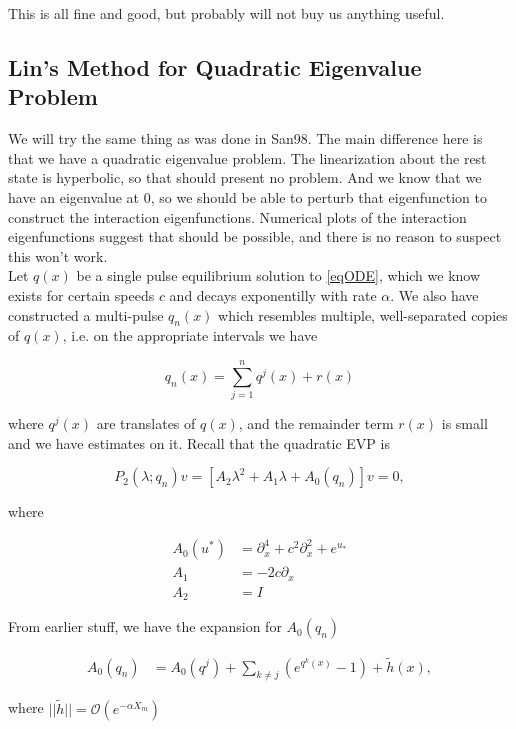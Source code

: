 \documentclass[12pt]{article}
\begin{document}
This is all fine and good, but probably will not buy us anything useful.


\subsection{Lin's Method for Quadratic Eigenvalue Problem}

We will try the same thing as was done in San98. The main difference here is that we have a quadratic eigenvalue problem. The linearization about the rest state is hyperbolic, so that should present no problem. And we know that we have an eigenvalue at 0, so we should be able to perturb that eigenfunction to construct the interaction eigenfunctions. Numerical plots of the interaction eigenfunctions suggest that should be possible, and there is no reason to suspect this won't work.\\


Let $q(x)$ be a single pulse equilibrium solution to \eqref{eqODE}, which we know exists for certain speeds $c$ and decays exponentilly with rate $\alpha$. We also have constructed a multi-pulse $q_n(x)$ which resembles multiple, well-separated copies of $q(x)$, i.e. on the appropriate intervals we have 

\[
q_n(x) = \sum_{j = 1}^{n} q^j(x) + r(x)
\]

where $q^j(x)$ are translates of $q(x)$, and the remainder term $r(x)$ is small and we have estimates on it. Recall that the quadratic EVP is

\begin{equation}\label{quadeig}
P_2(\lambda; q_n)v =  [A_2 \lambda^2 + A_1 \lambda + A_0(q_n)]v = 0,
\end{equation} 

where

\begin{align}
A_0(u^*) &= \partial_x^4 + c^2 \partial_x^2 + e^{u_*} \\
A_1 &= -2 c \partial_x \\
A_2 &= I
\end{align}

From earlier stuff, we have the expansion for $A_0(q_n)$

\begin{align}\label{A0expansion} 
A_0(q_n) &= A_0(q^j) + \sum_{k \neq j} (e^{q^k(x)} - 1) + \tilde{h}(x),
\end{align}

where $||\tilde{h}|| = \mathcal{O}(e^{-\alpha X_m})$ \\
\end{document}
